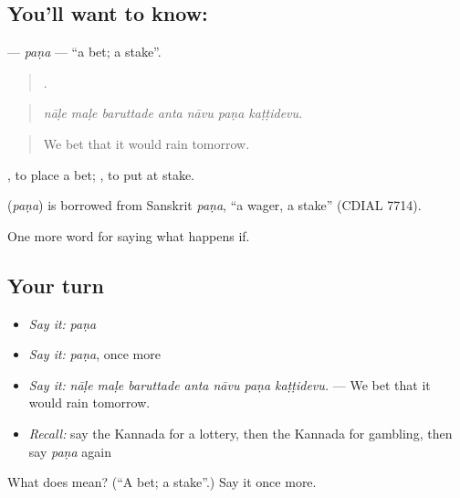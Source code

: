 \subsection*{You'll want to know: }
\textbf{} — \emph{paṇa} — \textquotedblleft{}a bet; a stake\textquotedblright{}.

\begin{quote}
      .
\end{quote}

\begin{quote}
\emph{nāḷe maḷe baruttade anta nāvu paṇa kaṭṭidevu.}
\end{quote}

\begin{quote}
We bet that it would rain tomorrow.
\end{quote}

 , to place a bet;  , to put at stake.

\begin{cousinweb}
\textbf{} (\emph{paṇa}) is borrowed from Sanskrit \emph{paṇa}, \textquotedblleft{}a wager, a stake\textquotedblright{} (CDIAL 7714).
\end{cousinweb}

\begin{grammarlens}[title={What you've built}]
One more word for saying what happens if.
\end{grammarlens}

\subsection*{Your turn}
\begin{itemize}
\raggedright
  \item \emph{Say it:} \emph{paṇa}
  \item \emph{Say it:} \emph{paṇa}, once more
  \item \emph{Say it:} \emph{nāḷe maḷe baruttade anta nāvu paṇa kaṭṭidevu.} — We bet that it would rain tomorrow.
  \item \emph{Recall:} say the Kannada for a lottery, then the Kannada for gambling, then say \emph{paṇa} again
\end{itemize}

\begin{tcolorbox}[breakable,colback=teal!4,colframe=teal!35!black,title={Before you move on}]
What does  mean? (\textquotedblleft{}A bet; a stake\textquotedblright{}.) Say it once more.
\end{tcolorbox}
